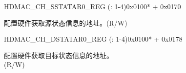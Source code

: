 \begin{register}{H}{DMAC\_CH\_SSTATAR0\_REG (: 1-4)}{0x0100* + 0x0170}\label{regdesc:DMACCHNSSTATAR0REG}
%
\regnewline%
\begin{regdesc}\begin{reglist}
\label{fielddesc:DMACCHNSSTATAR0}\item [DMAC\_CH\regindex{n}\_SSTATAR0] 配置硬件获取源状态信息的地址。(R/W)
\end{reglist}\end{regdesc}
\end{register}

\begin{register}{H}{DMAC\_CH\_DSTATAR0\_REG (: 1-4)}{0x0100* + 0x0178}\label{regdesc:DMACCHNDSTATAR0REG}
%
\regnewline%
\begin{regdesc}\begin{reglist}
\label{fielddesc:DMACCHNDSTATAR0}\item [DMAC\_CH\regindex{n}\_DSTATAR0] 配置硬件获取目标状态信息的地址。\\(R/W)
\end{reglist}\end{regdesc}
\end{register}
